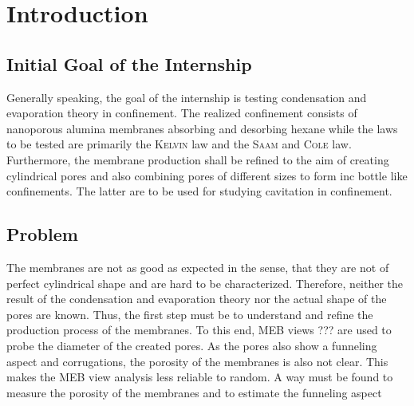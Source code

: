 \documentclass[../thesis.tex]{subfiles}
\begin{document}
    \chapter{Introduction}

    \section{Initial Goal of the Internship}

        Generally speaking, the goal of the internship is testing condensation and evaporation theory in confinement. The realized confinement consists of nanoporous alumina membranes absorbing and desorbing hexane while the laws to be tested are primarily the \textsc{Kelvin} law and the \textsc{Saam} and \textsc{Cole} law. Furthermore, the membrane production shall be refined to the aim of creating cylindrical pores and also combining pores of different sizes to form inc bottle like confinements. The latter are to be used for studying cavitation in confinement.


    \section{Problem}

        The membranes are not as good as expected in the sense, that they are not of perfect cylindrical shape and are hard to be characterized. Therefore, neither the result of the condensation and evaporation theory nor the actual shape of the pores are known. Thus, the first step must be to understand and refine the production process of the membranes. To this end, MEB views ??? are used to probe the diameter of the created pores. As the pores also show a funneling aspect and corrugations, the porosity of the membranes is also not clear. This makes the MEB view analysis less reliable to random. A way must be found to measure the porosity of the membranes and to estimate the funneling aspect
\end{document}
